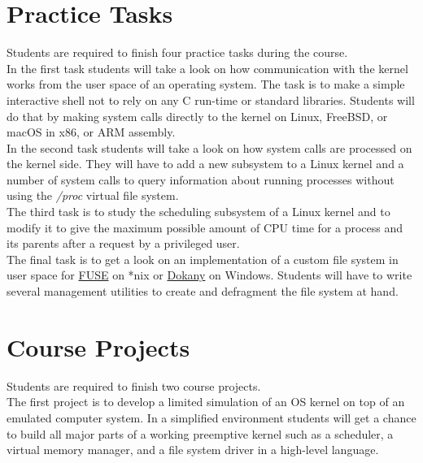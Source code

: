 \documentclass[12pt,a4paper,oneside]{article}
\begin{document}
    \section{Practice Tasks}

        Students are required to finish four practice tasks during the course.\\

        In the first task students will take a look on how communication with
        the kernel works from the user space of an operating system. The task is
        to make a simple interactive shell not to rely on any C run-time or
        standard libraries. Students will do that by making system calls
        directly to the kernel on Linux, FreeBSD, or macOS in x86, or ARM
        assembly.\\

        In the second task students will take a look on how system calls are
        processed on the kernel side. They will have to add a new subsystem to a
        Linux kernel and a number of system calls to query information about
        running processes without using the \textit{/proc} virtual file
        system.\\

        The third task is to study the scheduling subsystem of a Linux kernel
        and to modify it to give the maximum possible amount of CPU time for a
        process and its parents after a request by a privileged user.\\

        The final task is to get a look on an implementation of a custom file
        system in user space for \href{https://github.com/libfuse/libfuse}{FUSE}
        on *nix or \href{https://github.com/dokan-dev/dokany}{Dokany} on
        Windows. Students will have to write several management utilities to
        create and defragment the file system at hand.

    \section{Course Projects}

        Students are required to finish two course projects.\\

        The first project is to develop a limited simulation of an OS kernel on
        top of an emulated computer system. In a simplified environment students
        will get a chance to build all major parts of a working preemptive
        kernel such as a scheduler, a virtual memory manager, and a file system
        driver in a high-level language.\\
\end{document}
